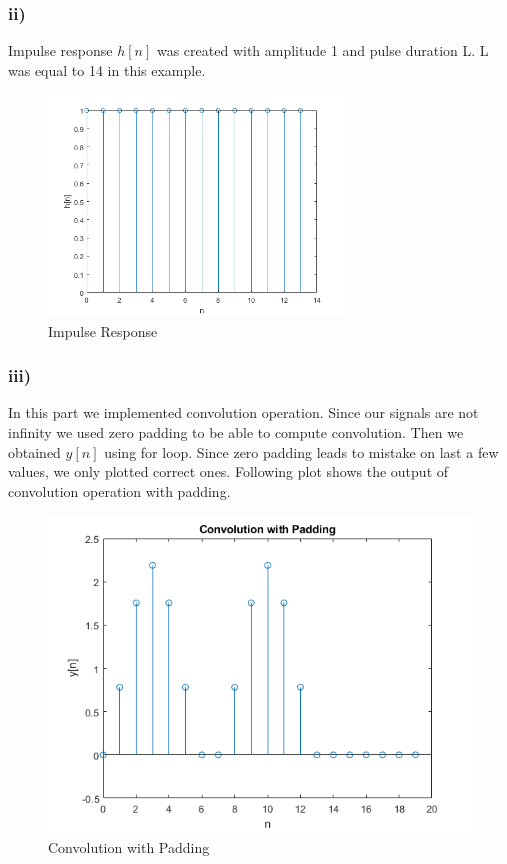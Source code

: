 \documentclass[letterpaper,12pt]{article}
\begin{document}
\subsubsection{ii)}
Impulse response \(h[n]\) was created with amplitude 1 and pulse duration L. L was equal to 14 in this example.
\begin{figure}[H]
    \centering
    \includegraphics[width = 0.7\textwidth]{i2.png}
    \caption{Impulse Response}
    \end{figure} 
    
\subsubsection{iii)}
In this part we implemented convolution operation. Since our signals are not infinity we used zero padding to be able to compute convolution. Then we obtained \(y[n]\) using for loop. Since zero padding leads to mistake on last a few values, we only plotted correct ones. Following plot shows the output of convolution operation with padding.
\begin{figure}[H]
    \centering
    \includegraphics[width = 1\textwidth]{convwithpadding.png}
    \caption{Convolution with Padding}
    \end{figure} 
    
\end{document}
